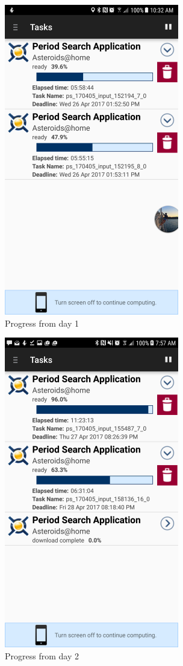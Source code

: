 \documentclass{article}
\begin{document}
\begin{figure}[ht]
      \includegraphics[width=3in]{img/t1s3.png}
      \centering
      \caption{Progress from day 1}
\end{figure}
\begin{figure}[ht]
      \includegraphics[width=3in]{img/t1s4.png}
      \centering
      \caption{Progress from day 2}
\end{figure}
\end{document}

